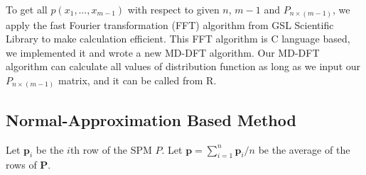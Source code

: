 \documentclass[12pt]{article}
\newcommand{\pvec}{\boldsymbol{p}}
\begin{document}
To get all $p(x_1,\dots,x_{m-1})$ with respect to given $n$, $m-1$ and $P_{n \times (m-1)}$, we apply the fast Fourier transformation (FFT) algorithm  from GSL Scientific Library to make calculation efficient. This FFT algorithm is C language based, we implemented it and wrote a new MD-DFT algorithm. Our MD-DFT algorithm can calculate all values of distribution function as long as we input our $P_{n\times (m-1)}$ matrix, and it can be called from R.



\subsection{Normal-Approximation Based Method}
Let $\pvec_i$ be the $i$th row of the SPM $P$. Let $\pvec=\sum_{i=1}^n\pvec_i/n$ be the average of the rows of $\boldsymbol{P}$.
\end{document}
